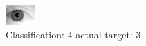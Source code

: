 \begin{figure}[h!]
\begin{center}
\includegraphics[width=0.60\columnwidth]{figures/ID2166_class_4_target_3.png}
\end{center}
\caption{ Classification: 4 actual target: 3}
\label{fig:ID2166_class_4_target_3}
\end{figure}
